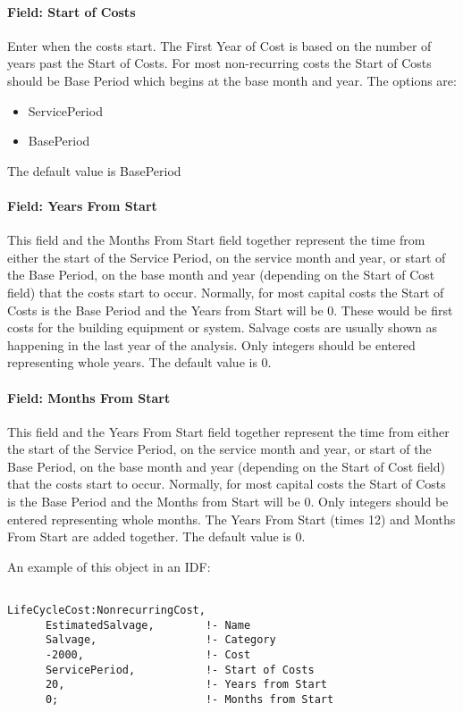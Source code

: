 \paragraph{Field: Start of Costs}\label{field-start-of-costs}

Enter when the costs start. The First Year of Cost is based on the number of years past the Start of Costs. For most non-recurring costs the Start of Costs should be Base Period which begins at the base month and year. The options are:

\begin{itemize}
\item
  ServicePeriod
\item
  BasePeriod
\end{itemize}

The default value is BasePeriod

\paragraph{Field: Years From Start}\label{field-years-from-start}

This field and the Months From Start field together represent the time from either the start of the Service Period, on the service month and year, or start of the Base Period, on the base month and year (depending on the Start of Cost field) that the costs start to occur. Normally, for most capital costs the Start of Costs is the Base Period and the Years from Start will be 0. These would be first costs for the building equipment or system. Salvage costs are usually shown as happening in the last year of the analysis. Only integers should be entered representing whole years. The default value is 0.

\paragraph{Field: Months From Start}\label{field-months-from-start}

This field and the Years From Start field together represent the time from either the start of the Service Period, on the service month and year, or start of the Base Period, on the base month and year (depending on the Start of Cost field) that the costs start to occur. Normally, for most capital costs the Start of Costs is the Base Period and the Months from Start will be 0. Only integers should be entered representing whole months. The Years From Start (times 12) and Months From Start are added together. The default value is 0.

An example of this object in an IDF:

\begin{lstlisting}

LifeCycleCost:NonrecurringCost,
      EstimatedSalvage,        !- Name
      Salvage,                 !- Category
      -2000,                   !- Cost
      ServicePeriod,           !- Start of Costs
      20,                      !- Years from Start
      0;                       !- Months from Start
\end{lstlisting}
